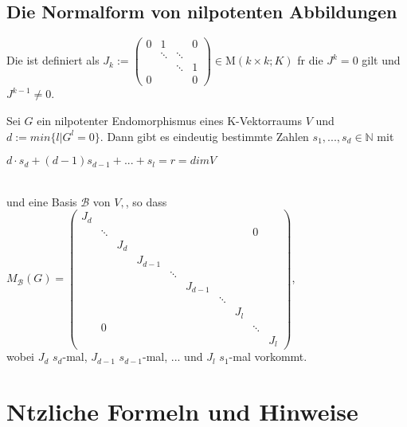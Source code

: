 \documentclass[11pt, a4paper]{article}
\begin{document}
\subsection{Die Normalform von nilpotenten Abbildungen}
\begin{definition}
Die  ist definiert als $J_{k}:=\left(\begin{array}{cccc}{0} & {1} & {} & {0} \\ {} & {\ddots} & {\ddots} & {} \\ {} & {} & {\ddots} & {1} \\ {0} & {} & {} & {0}\end{array}\right) \in \mathrm{M}(k \times k ; K)$ f\uee r die $J^k = 0$ gilt und $J^{k-1} \neq 0$.
\end{definition}
\begin{theorem}
Sei $G$ ein nilpotenter Endomorphismus eines K-Vektorraums $V$ und $d := min \{l | G^l = 0 \}$. Dann gibt es eindeutig bestimmte Zahlen $s_1, ..., s_d \in \mathbb{N}$ mit 
\\ \centerline{$d \cdot s_d +(d - 1)s_{d-1} + ... + s_l = r = dim V$}
\\und eine Basis $\mathcal{B}$ von $V,$, so dass 
$M_\mathcal{B}(G) =
\left( \begin{array}{cccccccccc}
{J_{d}} & {} & {} & {} & {} & {} & {} & {} & {} & {}
\\ {} & {\ddots} & {} & {} & {} & {} & {} & {} & {0} & {}
\\ {} & {} & {J_{d}} & {} & {} & {} & {} & {} & {} & {}
\\ {} & {} & {} & {J_{d-1}} & {} & {} & {} & {} & {} & {}
\\ {} & {} & {} & {} & {}\ddots & {} & {} & {} & {} & {}
\\ {} & {} & {} & {} & {} & {J_{d-1}} & {} & {} & {} & {}
\\ {} & {} & {} & {} & {} & {} & {\ddots} & {} & {} & {}
\\ {} & {} & {} & {} & {} & {} & {} & {J_{l}} & {} & {}
\\ {} & {0} & {} & {} & {} & {} & {} & {} & {\ddots} & {}
\\ {} & {} & {} & {} & {} & {} & {} & {} & {} & {J_{l}}
\end{array} 
\right)$,
\\wobei $J_d$ $s_d$-mal, $J_{d-1}$ $s_{d-1}$-mal, ... und $J_l$ $s_1$-mal vorkommt.
\end{theorem}


\section{N\uee tzliche Formeln und Hinweise}
\end{document}
